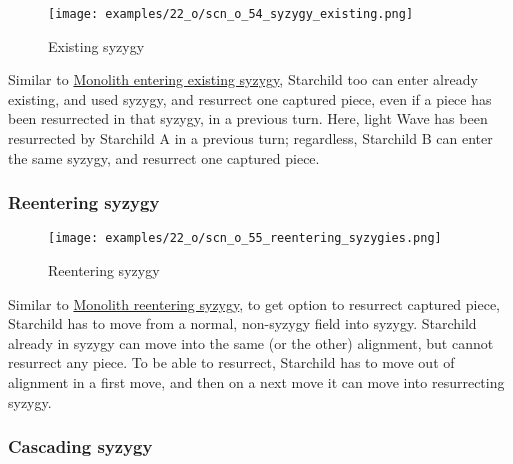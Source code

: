 \vspace*{-1.2\baselineskip}
\noindent
\begin{figure}[!h]
\texttt{[image: examples/22\_o/scn\_o\_54\_syzygy\_existing.png]}
\caption{Existing syzygy}
\label{fig:scn_o_54_syzygy_existing}
\end{figure}

Similar to \hyperref[fig:scn_d_26_syzygy_existing]{Monolith entering existing syzygy},
Starchild too can enter already existing, and used syzygy, and resurrect one captured
piece, even if a piece has been resurrected in that syzygy, in a previous turn. \newline
\indent
Here, light Wave has been resurrected by Starchild A in a previous turn; regardless,
Starchild B can enter the same syzygy, and resurrect one captured piece.

\clearpage %

\subsubsection*{Reentering syzygy}
\label{sec:One/Starchild/Syzygy/Reentering syzygy}

\vspace*{-1.2\baselineskip}
\noindent
\begin{figure}[!h]
\texttt{[image: examples/22\_o/scn\_o\_55\_reentering\_syzygies.png]}
\caption{Reentering syzygy}
\label{fig:scn_o_55_reentering_syzygies}
\end{figure}

Similar to
\hyperref[fig:scn_d_27_syzygy_reentering_same_move]{Monolith reentering syzygy},
to get option to resurrect captured piece, Starchild has to move from a normal,
non-syzygy field into syzygy. Starchild already in syzygy can move into the same
(or the other) alignment, but cannot resurrect any piece. To be able to resurrect,
Starchild has to move out of alignment in a first move, and then on a next move
it can move into resurrecting syzygy.

\clearpage %

\subsubsection*{Cascading syzygy}
\label{sec:One/Starchild/Syzygy/Cascading syzygy}

